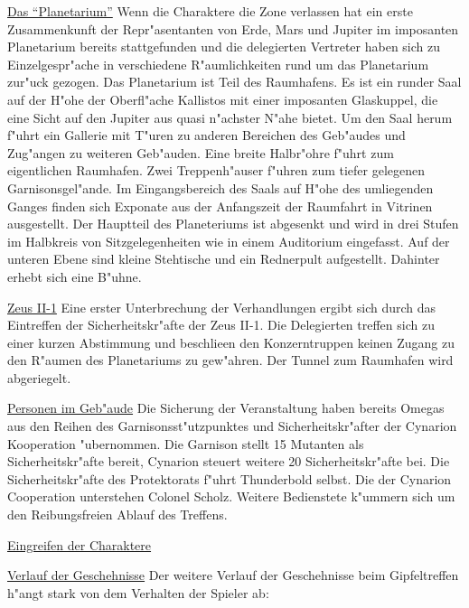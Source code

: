 \underline{Das "`Planetarium"'} Wenn die Charaktere die Zone verlassen hat ein erste Zusammenkunft der Repr"asentanten von Erde, Mars und Jupiter im imposanten Planetarium bereits stattgefunden und die delegierten Vertreter haben sich zu Einzelgespr"ache in verschiedene R"aumlichkeiten rund um das Planetarium zur"uck gezogen. Das Planetarium ist Teil des Raumhafens. Es ist ein runder Saal auf der H"ohe der Oberfl"ache Kallistos mit einer imposanten Glaskuppel, die eine Sicht auf den Jupiter aus quasi n"achster N"ahe bietet. Um den Saal herum f"uhrt ein Gallerie mit T"uren zu anderen Bereichen des Geb"audes und Zug"angen zu weiteren Geb"auden. Eine breite Halbr"ohre f"uhrt zum eigentlichen Raumhafen. Zwei Treppenh"auser f"uhren zum tiefer gelegenen Garnisonsgel"ande. Im Eingangsbereich des Saals auf H"ohe des umliegenden Ganges finden sich Exponate aus der Anfangszeit der Raumfahrt in Vitrinen ausgestellt. Der Hauptteil des Planeteriums ist abgesenkt und wird in drei Stufen im Halbkreis von Sitzgelegenheiten wie in einem Auditorium eingefasst. Auf der unteren Ebene sind kleine Stehtische und ein Rednerpult aufgestellt. Dahinter erhebt sich eine B"uhne.

\underline{Zeus II-1} Eine erster Unterbrechung der Verhandlungen ergibt sich durch das Eintreffen der Sicherheitskr"afte der Zeus II-1. Die Delegierten treffen sich zu einer kurzen Abstimmung und beschlie\3en den Konzerntruppen keinen Zugang zu den R"aumen des Planetariums zu gew"ahren. Der Tunnel zum Raumhafen wird abgeriegelt. 

\underline{Personen im Geb"aude} Die Sicherung der Veranstaltung haben bereits Omegas aus den Reihen des Garnisonsst"utzpunktes und Sicherheitskr"after der Cynarion Kooperation "ubernommen. Die Garnison stellt 15 Mutanten als Sicherheitskr"afte bereit, Cynarion steuert weitere 20 Sicherheitskr"afte bei. Die Sicherheitskr"afte des Protektorats f"uhrt Thunderbold selbst. Die der Cynarion Cooperation unterstehen Colonel Scholz. Weitere Bedienstete k"ummern sich um den Reibungsfreien Ablauf des Treffens.

\underline{Eingreifen der Charaktere}

\underline{Verlauf der Geschehnisse} Der weitere Verlauf der Geschehnisse beim Gipfeltreffen h"angt stark von dem Verhalten der Spieler ab:

